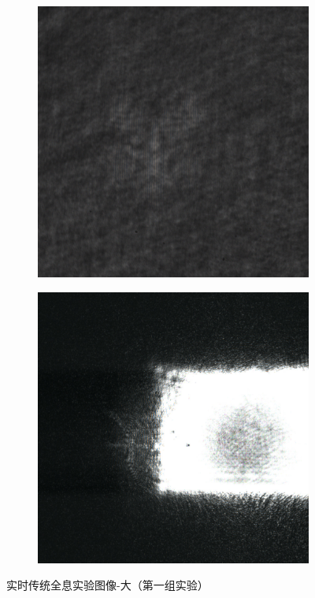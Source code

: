 \documentclass{ctexart}
\begin{document}
\begin{figure}[H]
  \centering
  \begin{subfigure}{.48\textwidth}
    \includegraphics[width=\linewidth]{数字全息实验数据/数字全息/大1/大1.jpg}
  \end{subfigure}
  \begin{subfigure}{.48\textwidth}
    \includegraphics[width=\linewidth]{数字全息实验数据/实时传统全息/大1结果.jpg}
  \end{subfigure}
  \caption{实时传统全息实验图像-大（第一组实验）}
\end{figure}
\end{document}
